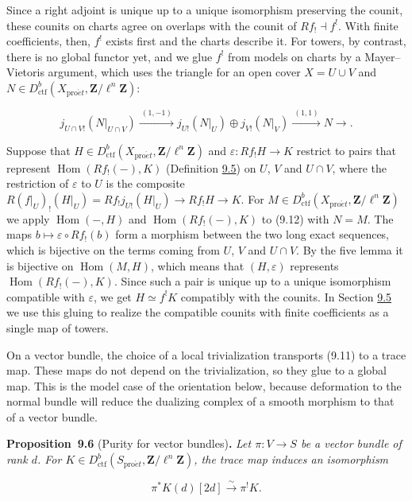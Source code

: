 \documentclass[11pt]{article}
\newenvironment{bpstatement}[2]{\par\addvspace{0.6\baselineskip}\noindent\textbf{#1}#2\textbf{.}\enspace\ignorespaces}
  {\par\addvspace{0.4\baselineskip}}
\newenvironment{bpstatementit}[2]{\begin{bpstatement}{#1}{#2}\itshape\ignorespaces}{\end{bpstatement}}
\begin{document}
Since a right adjoint is unique up to a unique isomorphism preserving the counit, these counits on charts agree on overlaps with the counit of \(Rf_!\dashv f^!\). With finite coefficients, then, \(f^!\) exists first and the charts describe it. For towers, by contrast, there is no global functor yet, and we glue \(f^!\) from models on charts by a Mayer–Vietoris argument, which uses the triangle for an open cover \(X=U\cup V\) and \(N\in D^b_{\mathrm{ctf}}(X_{\mathrm{pro}\acute{e}t},\mathbf Z/\ell^n\mathbf Z)\):

\[
j_{U\cap V!}(N|_{U\cap V})
\xrightarrow{\ (1,-1)\ }
j_{U!}(N|_U)\oplus j_{V!}(N|_V)
\xrightarrow{\ (1,1)\ }N\longrightarrow{} .
\tag{9.12}
\]

Suppose that \(H\in D^b_{\mathrm{ctf}}(X_{\mathrm{pro}\acute{e}t},\mathbf Z/\ell^n\mathbf Z)\) and \(\varepsilon:Rf_!H\to K\) restrict to pairs that represent \(\operatorname{Hom}(Rf_!(-),K)\) (Definition \hyperref[bp17]{9.5}) on \(U\), \(V\) and \(U\cap V\), where the restriction of \(\varepsilon\) to \(U\) is the composite \(R(f|_U)_!(H|_U)=Rf_!j_{U!}(H|_U)\to Rf_!H\to K\). For \(M\in D^b_{\mathrm{ctf}}(X_{\mathrm{pro}\acute{e}t},\mathbf Z/\ell^n\mathbf Z)\) we apply \(\operatorname{Hom}(-,H)\) and \(\operatorname{Hom}(Rf_!(-),K)\) to (9.12) with \(N=M\). The maps \(b\mapsto\varepsilon\circ Rf_!(b)\) form a morphism between the two long exact sequences, which is bijective on the terms coming from \(U\), \(V\) and \(U\cap V\). By the five lemma it is bijective on \(\operatorname{Hom}(M,H)\), which means that \((H,\varepsilon)\) represents \(\operatorname{Hom}(Rf_!(-),K)\). Since such a pair is unique up to a unique isomorphism compatible with \(\varepsilon\), we get \(H\simeq f^!K\) compatibly with the counits. In Section \hyperref[bp39]{9.5} we use this gluing to realize the compatible counits with finite coefficients as a single map of towers.

On a vector bundle, the choice of a local trivialization transports (9.11) to a trace map. These maps do not depend on the trivialization, so they glue to a global map. This is the model case of the orientation below, because deformation to the normal bundle will reduce the dualizing complex of a smooth morphism to that of a vector bundle.

\label{bp19}%
\begin{bpstatementit}{Proposition~9.6}{ (Purity for vector bundles)}
Let \(\pi:V\to S\) be a vector bundle of rank \(d\). For \(K\in D^b_{\mathrm{ctf}}(S_{\mathrm{pro}\acute{e}t},\mathbf Z/\ell^n\mathbf Z)\), the trace map induces an isomorphism

\[
\pi^{*}K(d)[2d]\xrightarrow{\sim}\pi^{!}K.
\]
\end{bpstatementit}
\end{document}
